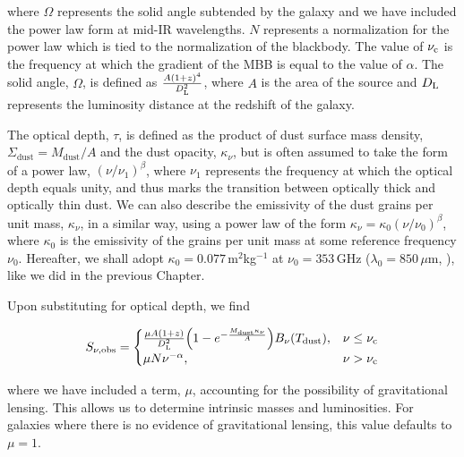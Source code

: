 \noindent where $\Omega$ represents the solid angle subtended by the galaxy and we have included the power law form at mid-IR wavelengths. $N$ represents a normalization for the power law which is tied to the normalization of the blackbody. The value of $\nu_{\rm c}$ is the frequency at which the gradient of the MBB is equal to the value of $\alpha$. The solid angle, $\Omega$, is defined as $\frac{A(1+z)^4}{D_{\rm L}^2}$, where $A$ is the area of the source and $D_{\rm L}$ represents the luminosity distance at the redshift of the galaxy. 

The optical depth, $\tau$, is defined as the product of dust surface mass density, $\Sigma_{\textrm{dust}} = M_{\textrm{dust}}/A$ and the dust opacity, $\kappa_\nu$, but is often assumed to take the form of a power law, $(\nu/\nu_1)^\beta$, where $\nu_1$ represents the frequency at which the optical depth equals unity, and thus marks the transition between optically thick and optically thin dust. We can also describe the emissivity of the dust grains per unit mass, $\kappa_\nu$, in a similar way, using a power law of the form $\kappa_\nu = \kappa_0(\nu/\nu_0)^\beta$, where $\kappa_0$ is the emissivity of the grains per unit mass at some reference frequency $\nu_0$. Hereafter, we shall adopt $\kappa_0 = 0.077\,$m$^2$kg$^{-1}$ at $\nu_0 = 353\,$GHz ($\lambda_0 = 850\,\mu$m, \citealt{Dunne_2000, James_2002}), like we did in the previous Chapter.

Upon substituting for optical depth, we find 

\begin{equation}
	S_{\nu, \textrm{obs}} =  
	\begin{cases}
		\frac{\mu A (1+z)}{D_{\rm L}^2} \Big(1- e^{-\frac{M_{\textrm{dust}}\kappa_\nu}{A}}\Big) B_\nu(T_{\textrm{dust}}), & \nu \le \nu_{\rm c} \\
		\mu N \nu^{-\alpha}, & \nu > \nu_{\rm c} \\
	\end{cases}
\end{equation}

\noindent where we have included a term, $\mu$, accounting for the possibility of gravitational lensing. This allows us to determine intrinsic masses and luminosities. For galaxies where there is no evidence of gravitational lensing, this value defaults to $\mu = 1$.

